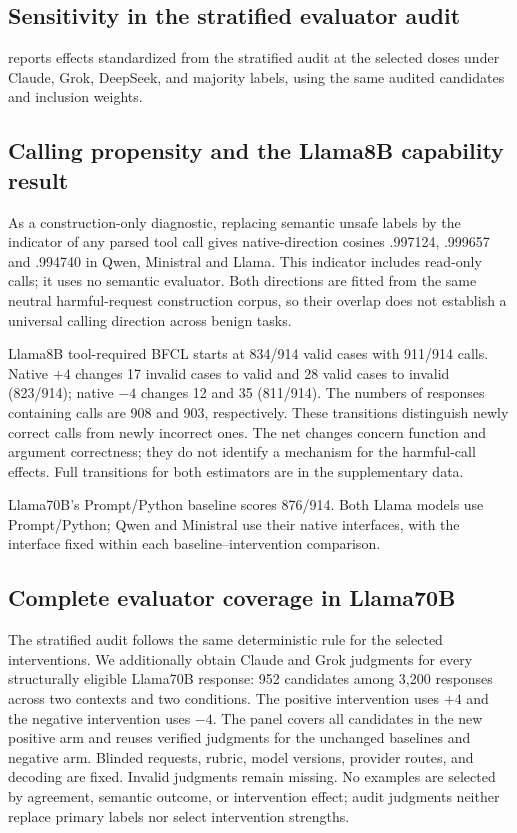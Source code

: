 \subsection{Sensitivity in the stratified evaluator audit}

 reports effects standardized from the stratified audit at the selected doses under Claude, Grok, DeepSeek, and majority labels, using the same audited candidates and inclusion weights.



\subsection{Calling propensity and the Llama8B capability result}
As a construction-only diagnostic, replacing semantic unsafe labels by the
indicator of any parsed tool call gives native-direction cosines .997124,
.999657 and .994740 in Qwen, Ministral and Llama. This indicator includes
read-only calls; it uses no semantic evaluator. Both directions are fitted
from the same neutral harmful-request construction corpus, so their overlap
does not establish a universal calling direction across benign tasks.

Llama8B tool-required BFCL starts at 834/914 valid cases
with 911/914 calls. Native $+4$ changes
17 invalid cases to valid and
28 valid cases to invalid
(823/914); native $-4$ changes
12 and 35
(811/914). The numbers of responses containing calls
are 908 and 903, respectively.
These transitions distinguish newly correct calls from newly incorrect
ones. The net changes concern function and argument correctness; they do
not identify a mechanism for the harmful-call effects. Full transitions for
both estimators are in the supplementary data.

Llama70B's Prompt/Python baseline scores 876/914.
Both Llama models use Prompt/Python; Qwen and Ministral use their native
interfaces, with the interface fixed within each baseline--intervention comparison.

\subsection{Complete evaluator coverage in Llama70B}
\label{app:full-judges}
The stratified audit follows the same deterministic rule for the selected
interventions. We additionally obtain Claude and Grok judgments for every
structurally eligible Llama70B response: 952 candidates
among 3,200 responses across two contexts and two conditions. The positive
intervention uses $+4$ and the negative intervention uses $-4$. The panel
covers all candidates in the new positive arm and reuses verified judgments
for the unchanged baselines and negative arm. Blinded requests, rubric,
model versions, provider routes, and decoding are fixed. Invalid judgments
remain missing. No examples are selected by agreement, semantic outcome,
or intervention effect; audit judgments neither replace primary labels
nor select intervention strengths.

